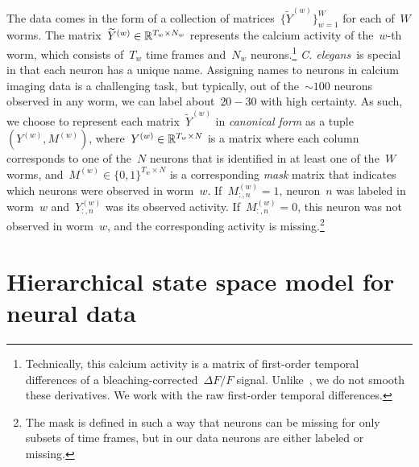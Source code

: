 \documentclass[11pt]{article}
\newcommand{\celegans}{\textit{C. elegans}}
\begin{document}
The data comes in the form of a collection of matrices~$\{\widetilde{Y}^{(w)}\}_{w=1}^W$
for each of~$W$ worms.  The matrix~${\widetilde{Y}^{(w)} \in \mathbb{R}^{T_w \times N_w}}$
represents the calcium activity of the~$w$-th worm, which consists of~$T_w$
time frames and~$N_w$ neurons.\footnote{Technically, this calcium activity is
a matrix of first-order temporal differences of a
bleaching-corrected~$\Delta F /F$ signal. Unlike~\citet{kato2015global}, we
do not smooth these derivatives. We work with the raw first-order
temporal differences.}  \celegans~is special in that each neuron has a unique
name.  Assigning names to neurons in calcium imaging data is a challenging
task, but typically, out of the~${\sim 100}$ neurons observed in any worm,
we can label about~$20-30$ with high certainty.  As such, we choose to
represent each matrix~$\widetilde{Y}^{(w)}$ in \emph{canonical form} as a
tuple~$(Y^{(w)}, M^{(w)})$, where~${Y^{(w)} \in \mathbb{R}^{T_w \times N}}$ is
a matrix where each column corresponds to one of the~$N$ neurons that is
identified in at least one of the~$W$ worms, and~${M^{(w)} \in \{0,1\}^{T_w \times N}}$
is a corresponding \emph{mask} matrix that indicates which neurons were
observed in worm~$w$.  If~$M_{:,n}^{(w)} = 1$, neuron~$n$ was labeled in
worm~$w$ and~$Y_{:,n}^{(w)}$ was its observed activity.  If~$M_{:,n}^{(w)}=0$,
this neuron was not observed in worm~$w$, and the corresponding activity
is missing.\footnote{The mask is defined in such a way that neurons can
  be missing for only subsets of time frames, but in our data neurons are
  either labeled or missing.}

\section{Hierarchical state space model for neural data}
\label{sec:slds}
\end{document}
